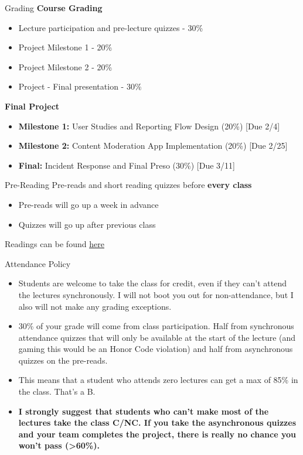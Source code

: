 \documentclass[nobackground,dvipsnames,table]{beamer}
\begin{document}
\begin{frame}{Grading}
    \textbf{Course Grading}
    \begin{itemize}
        \item Lecture participation and pre-lecture quizzes - 30\%
        \item Project Milestone 1 - 20\%
        \item Project Milestone 2 - 20\%
        \item Project - Final presentation - 30\% \\
    \end{itemize}
    
    \textbf{Final Project}
    \begin{itemize} %
        \item \textbf{Milestone 1:} User Studies and Reporting Flow Design (20\%) [Due 2/4]
        \item \textbf{Milestone 2:} Content Moderation App Implementation (20\%) [Due 2/25]
        \item \textbf{Final:}  Incident Response and Final Preso (30\%) [Due 3/11]
    \end{itemize}
\end{frame}

\begin{frame}{Pre-Reading}
    Pre-reads and short reading quizzes before \bfseries every \mdseries class
    \begin{itemize}
        \item Pre-reads will go up a week in advance
        \item Quizzes will go up after previous class
    \end{itemize}
    Readings can be found \underline{\href{https://docs.google.com/document/d/1ljWErgPIRi3ZH4I_iuqqlWF8bERIiDPdakzyjxUccPo/edit}{here}} %
\end{frame}

\begin{frame}{Attendance Policy}
    \begin{itemize}
        \item Students are welcome to take the class for credit, even if they can't attend the lectures synchronously. I will not boot you out for non-attendance, but I also will not make any grading exceptions.
        \item 30\% of your grade will come from class participation. Half from synchronous attendance quizzes that will only be available at the start of the lecture (and gaming this would be an Honor Code violation) and half from asynchronous quizzes on the pre-reads.
        \item This means that a student who attends zero lectures can get a max of 85\% in the class. That's a B. 
        \item \bfseries I strongly suggest that students who can't make most of the lectures take the class C/NC. \mdseries
        If you take the asynchronous quizzes and your team completes the project, there is really no chance you won't pass (>60\%).
    \end{itemize}
\end{frame}
\end{document}
